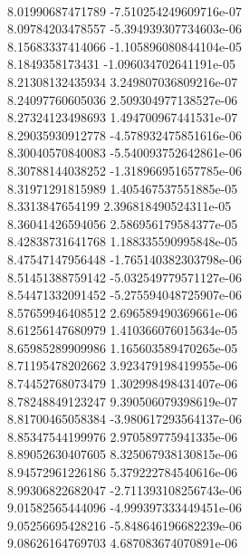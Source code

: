 { \\
8.01990687471789 -7.510254249609716e-07
 \\
8.09784203478557 -5.394939307734603e-06
 \\
8.15683337414066 -1.105896080844104e-05
 \\
8.1849358173431 -1.096034702641191e-05
 \\
8.21308132435934 3.249807036809216e-07
 \\
8.24097760605036 2.509304977138527e-06
 \\
8.27324123498693 1.494700967441531e-07
 \\
8.29035930912778 -4.578932475851616e-06
 \\
8.30040570840083 -5.540093752642861e-06
 \\
8.30788144038252 -1.318966951657785e-06
 \\
8.31971291815989 1.405467537551885e-05
 \\
8.3313847654199 2.396818490524311e-05
 \\
8.36041426594056 2.586956179584377e-05
 \\
8.42838731641768 1.188335590995848e-05
 \\
8.47547147956448 -1.765140382303798e-06
 \\
8.51451388759142 -5.032549779571127e-06
 \\
8.54471332091452 -5.275594048725907e-06
 \\
8.57659946408512 2.696589490369661e-06
 \\
8.61256147680979 1.410366076015634e-05
 \\
8.65985289909986 1.165603589470265e-05
 \\
8.71195478202662 3.923479198419955e-06
 \\
8.74452768073479 1.302998498431407e-06
 \\
8.78248849123247 9.390506079398619e-07
 \\
8.81700465058384 -3.980617293564137e-06
 \\
8.85347544199976 2.970589775941335e-06
 \\
8.89052630407605 8.325067938130815e-06
 \\
8.94572961226186 5.379222784540616e-06
 \\
8.99306822682047 -2.711393108256743e-06
 \\
9.01582565444096 -4.999397333449451e-06
 \\
9.05256695428216 -5.848646196682239e-06
 \\
9.08626164769703 4.687083674070891e-06
 \\
}
